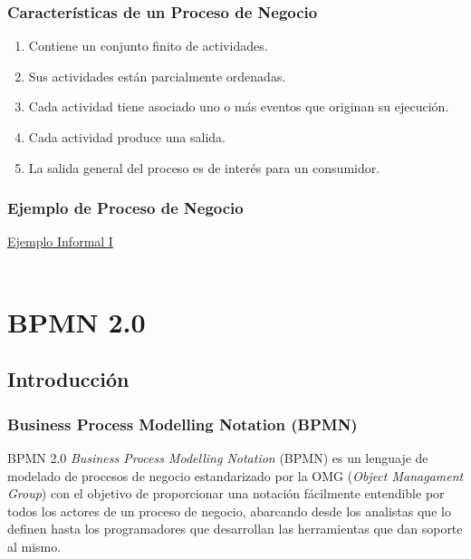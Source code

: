 \documentclass[handout,a4paper,slidestop,xcolor=pst,blue]{beamer}
\begin{document}
\begin{frame}[c]
    \frametitle{Características de un Proceso de Negocio}
    \begin{enumerate}[<+->]
        \item Contiene un conjunto finito de actividades.
        \item Sus actividades están parcialmente ordenadas.
        \item Cada actividad tiene asociado uno o más eventos que originan su ejecución.
        \item Cada actividad produce una salida.
        \item La salida general del proceso es de interés para un consumidor.
    \end{enumerate}
\end{frame}

\begin{frame}[c]
    \frametitle{Ejemplo de Proceso de Negocio}
    \begin{center}
        \href{http://youtu.be/gQ_OHOelPvM}{Ejemplo Informal I} \ \\ \ \\
    \end{center}
\end{frame}

\section{BPMN 2.0}

\subsection{Introducción}

\begin{frame}[c]
    \frametitle{Business Process Modelling Notation (BPMN)}
    \begin{block}{BPMN 2.0}
        \emph{Business Process Modelling Notation} (BPMN) es un lenguaje de modelado de procesos de negocio estandarizado por la OMG (\emph{Object Managament Group}) con el objetivo de proporcionar una notación fácilmente entendible por todos los actores de un proceso de negocio, abarcando desde los analistas que lo definen hasta los programadores que desarrollan las herramientas que dan soporte al mismo.
    \end{block}
\end{frame}
\end{document}

